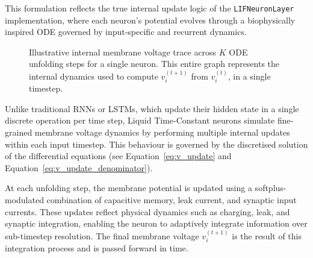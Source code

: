 \noindent This formulation reflects the true internal update logic of the \texttt{LIFNeuronLayer} implementation, where each neuron's potential evolves through a biophysically inspired ODE governed by input-specific and recurrent dynamics.

\begin{figure}[H]
    \centering
    \caption{Illustrative internal membrane voltage trace across $K$ ODE unfolding steps for a single neuron. This entire graph represents the internal dynamics used to compute $v_i^{(t+1)}$ from $v_i^{(t)}$, in a single timestep.}
    \label{fig:lif_voltage_evolution}
\end{figure}

Unlike traditional RNNs or LSTMs, which update their hidden state in a single discrete operation per time step, Liquid Time-Constant neurons simulate fine-grained membrane voltage dynamics by performing multiple internal updates within each input timestep. This behaviour is governed by the discretised solution of the differential equations (see Equation~\ref{eq:v_update} and Equation~\ref{eq:v_update_denominator}).

At each unfolding step, the membrane potential is updated using a softplus-modulated combination of capacitive memory, leak current, and synaptic input currents. These updates reflect physical dynamics such as charging, leak, and synaptic integration, enabling the neuron to adaptively integrate information over sub-timestep resolution. The final membrane voltage $v_i^{(t+1)}$ is the result of this integration process and is passed forward in time.

